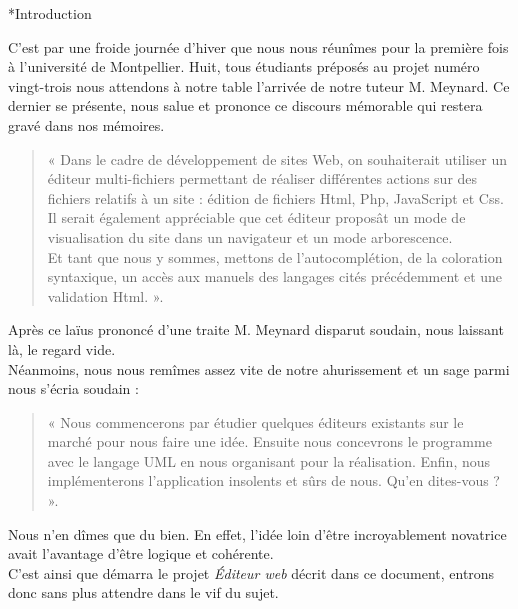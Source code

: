 \documentclass[a4paper, 12pt]{report}
\begin{document}
	\begin{chapter}*{Introduction}

	C'est par une froide journée d'hiver que nous nous réunîmes pour la première fois à l'université de Montpellier. 
	Huit, tous étudiants préposés au projet numéro vingt-trois nous attendons à notre table l'arrivée de notre tuteur M. Meynard. 
	Ce dernier se présente, nous salue et prononce ce discours mémorable qui restera gravé dans nos mémoires.\\
	\begin{quotation}
		« Dans le cadre de développement de sites Web, on souhaiterait utiliser un éditeur multi-fichiers permettant de réaliser 
		différentes actions sur	des fichiers relatifs à un site : édition de fichiers \gls{Html}, \gls{Php}, \gls{JavaScript} et \gls{Css}.\\

		Il serait également appréciable que cet éditeur proposât un mode de visualisation du site dans un navigateur et un mode arborescence.\\

		Et tant que nous y sommes, mettons de l'\gls{autocomplétion}, de la coloration syntaxique, un accès aux manuels
		des langages cités précédemment et une validation \gls{Html}. ».
	\end{quotation}

	Après ce laïus prononcé d'une traite M. Meynard disparut soudain, nous laissant là, le regard vide.\\


	Néanmoins, nous nous remîmes assez vite de notre ahurissement et un sage parmi nous s'écria soudain :
	\begin{quotation}
		« Nous commencerons par étudier quelques éditeurs existants sur le marché pour nous faire une idée. Ensuite nous concevrons
		le programme avec le langage UML en nous organisant pour la réalisation.
		Enfin, nous implémenterons l'application insolents et sûrs de nous.	Qu'en dites-vous ? ».
	\end{quotation}

	Nous n'en dîmes que du bien. En effet, l'idée loin d'être incroyablement novatrice avait l'avantage d'être logique et cohérente.\\


	C'est ainsi que démarra le projet \emph{Éditeur web} décrit dans ce document, entrons donc sans plus attendre dans le vif du sujet.
	
	\end{chapter}
\end{document}
